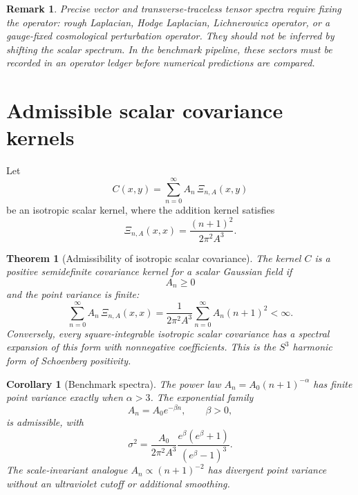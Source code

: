 \documentclass[
  aps,
  prd,
  reprint,
  superscriptaddress,
  nofootinbib,
  floatfix,
  longbibliography
]{revtex4-2}
\newtheorem{theorem}{Theorem}
\newtheorem{corollary}{Corollary}
\newtheorem{remark}{Remark}
\begin{document}
\begin{remark}
Precise vector and transverse-traceless tensor spectra require fixing the
operator: rough Laplacian, Hodge Laplacian, Lichnerowicz operator, or a gauge-fixed
cosmological perturbation operator.  They should not be inferred by shifting the
scalar spectrum.  In the benchmark pipeline, these sectors must be recorded in an
operator ledger before numerical predictions are compared.
\end{remark}

\section{Admissible scalar covariance kernels}
\label{sec:cov}

Let
\begin{equation}
  C(x,y)=\sum_{n=0}^{\infty}A_n\,\Xi_{n,A}(x,y)
\end{equation}
be an isotropic scalar kernel, where the addition kernel satisfies
\begin{equation}
  \Xi_{n,A}(x,x)=\frac{(n+1)^2}{2\pi^2A^3}.
\end{equation}

\begin{theorem}[Admissibility of isotropic scalar covariance]
\label{thm:cov}
The kernel \(C\) is a positive semidefinite covariance kernel for a scalar
Gaussian field if
\begin{equation}
  A_n\ge0
  \label{eq:Anpos}
\end{equation}
and the point variance is finite:
\begin{equation}
  \sum_{n=0}^{\infty}A_n\,\Xi_{n,A}(x,x)
  =
  \frac{1}{2\pi^2A^3}
  \sum_{n=0}^{\infty}A_n(n+1)^2
  <\infty .
  \label{eq:variance}
\end{equation}
Conversely, every square-integrable isotropic scalar covariance has a spectral
expansion of this form with nonnegative coefficients.  This is the \(S^3\)
harmonic form of Schoenberg positivity.
\end{theorem}

\begin{corollary}[Benchmark spectra]
\label{cor:spectra}
The power law \(A_n=A_0(n+1)^{-\alpha}\) has finite point variance exactly when
\(\alpha>3\).  The exponential family
\begin{equation}
  A_n=A_0e^{-\beta n},\qquad \beta>0,
\end{equation}
is admissible, with
\begin{equation}
  \sigma^2=
  \frac{A_0}{2\pi^2A^3}
  \frac{e^\beta(e^\beta+1)}{(e^\beta-1)^3}.
\end{equation}
The scale-invariant analogue \(A_n\propto(n+1)^{-2}\) has divergent point variance
without an ultraviolet cutoff or additional smoothing.
\end{corollary}
\end{document}
